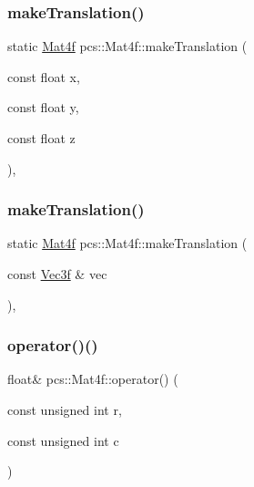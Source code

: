 \mbox{\label{structpcs_1_1Mat4f_af221a379a3419f70b69c0339d499434c}} 
\subsubsection{\texorpdfstring{make\+Translation()}{makeTranslation()}\hspace{0.1cm}{\footnotesize\ttfamily [1/2]}}
{\footnotesize\ttfamily static \hyperlink{structpcs_1_1Mat4f}{Mat4f} pcs\+::\+Mat4f\+::make\+Translation (\begin{DoxyParamCaption}\item[{const float}]{x,  }\item[{const float}]{y,  }\item[{const float}]{z }\end{DoxyParamCaption})\hspace{0.3cm}{\ttfamily [inline]}, {\ttfamily [static]}}

\mbox{\label{structpcs_1_1Mat4f_aab015352eaa466dbb0c5c11d361f85af}} 
\subsubsection{\texorpdfstring{make\+Translation()}{makeTranslation()}\hspace{0.1cm}{\footnotesize\ttfamily [2/2]}}
{\footnotesize\ttfamily static \hyperlink{structpcs_1_1Mat4f}{Mat4f} pcs\+::\+Mat4f\+::make\+Translation (\begin{DoxyParamCaption}\item[{const \hyperlink{namespacepcs_a68e0f517680976c17c810ffe6952cbab}{Vec3f} \&}]{vec }\end{DoxyParamCaption})\hspace{0.3cm}{\ttfamily [inline]}, {\ttfamily [static]}}

\mbox{\label{structpcs_1_1Mat4f_ac854e422b3f3bec5ffbbf366b71e5b0c}} 
\subsubsection{\texorpdfstring{operator()()}{operator()()}}
{\footnotesize\ttfamily float\& pcs\+::\+Mat4f\+::operator() (\begin{DoxyParamCaption}\item[{const unsigned int}]{r,  }\item[{const unsigned int}]{c }\end{DoxyParamCaption})\hspace{0.3cm}{\ttfamily [inline]}}

